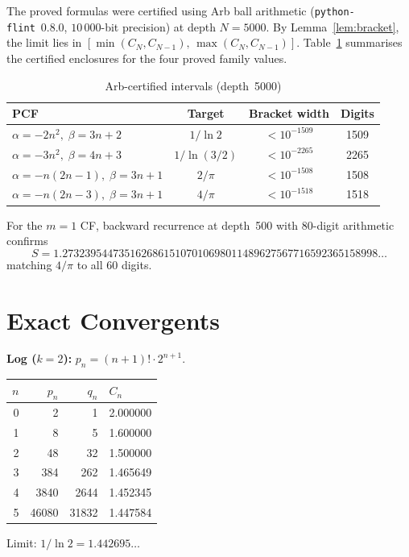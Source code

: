 \documentclass[11pt,a4paper]{article}
\theoremstyle{plain}
\theoremstyle{definition}
\theoremstyle{remark}
\begin{document}
The proved formulas were certified using Arb ball arithmetic
(\texttt{python-flint}~0.8.0, $10\,000$-bit precision)
at depth $N = 5000$.
By Lemma~\ref{lem:bracket}, the limit lies in
$[\min(C_N, C_{N-1}),\, \max(C_N, C_{N-1})]$.
Table~\ref{tab:cert} summarises the certified enclosures for the four
proved family values.

\begin{table}[ht]
\centering
\caption{Arb-certified intervals (depth~5000)}\label{tab:cert}
\begin{tabular}{@{}lccc@{}}
\toprule
PCF & Target & Bracket width & Digits \\
\midrule
$\alpha{=}{-}2n^2,\;\beta{=}3n{+}2$
  & $1/\ln 2$    & $<10^{-1509}$ & 1509 \\
$\alpha{=}{-}3n^2,\;\beta{=}4n{+}3$
  & $1/\ln(3/2)$ & $<10^{-2265}$ & 2265 \\
$\alpha{=}{-}n(2n{-}1),\;\beta{=}3n{+}1$
  & $2/\pi$      & $<10^{-1508}$ & 1508 \\
$\alpha{=}{-}n(2n{-}3),\;\beta{=}3n{+}1$
  & $4/\pi$      & $<10^{-1518}$ & 1518 \\
\bottomrule
\end{tabular}
\end{table}

For the $m = 1$ CF, backward recurrence at depth~500 with
80-digit arithmetic confirms
\[
  S = 1.27323954473516268615107010698011489627567716592365158998\ldots
\]
matching $4/\pi$ to all 60 digits.

\section{Exact Convergents}\label{app:conv}

\textbf{Log ($k{=}2$):} $p_n = (n{+}1)!\cdot 2^{n+1}$.

\smallskip
\begin{center}
\begin{tabular}{@{}rrrl@{}}
\toprule
$n$ & $p_n$ & $q_n$ & $C_n$ \\
\midrule
0 & 2 & 1 & 2.000000 \\
1 & 8 & 5 & 1.600000 \\
2 & 48 & 32 & 1.500000 \\
3 & 384 & 262 & 1.465649 \\
4 & 3840 & 2644 & 1.452345 \\
5 & 46080 & 31832 & 1.447584 \\
\bottomrule
\end{tabular}
\end{center}
\smallskip\noindent Limit: $1/\ln 2 = 1.442695\ldots$
\end{document}
